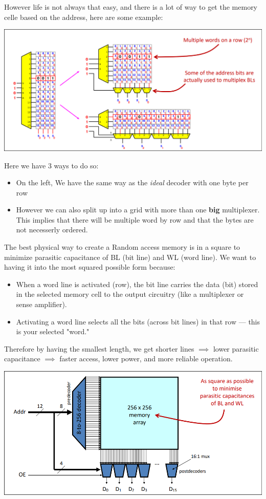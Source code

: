 However life is not always that easy, and there is a lot of way to get the memory celle based on the address, here are some example:
\begin{center}
\includegraphics[scale=0.4]{screenshots/2025-10-12_2.png}
\end{center}
Here we have 3 ways to do so:
\begin{itemize}
    \item On the left, We have the same way as the \textit{ideal} decoder with one byte per row 
    \item However we can also split up into a grid with more than one \textbf{big} multiplexer. This implies that there will be multiple word by row and that the bytes are not necesserly ordered.
\end{itemize}
The best physical way to create a Random access memory is in a square to minimize parasitic capacitance of BL (bit line) and WL (word line). We want to having it into the most squared possible form because:
\begin{itemize}
	\item When a word line is activated (row), the bit line carries the data (bit) stored in the selected memory cell to the output circuitry (like a multiplexer or sense amplifier).
	\item Activating a word line selects all the bits (across bit lines) in that row — this is your selected "word."
\end{itemize}
Therefore by having the smallest length, we get shorter lines $\implies $ lower parasitic capacitance $\implies$ faster access, lower power, and more reliable operation.
\begin{center}
\includegraphics[scale=0.3]{screenshots/2025-10-12_3.png}
\end{center}

